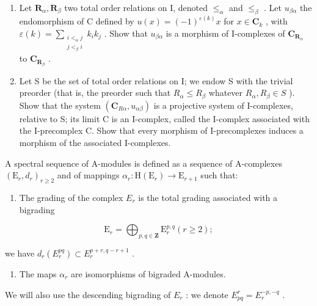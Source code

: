 \begin{enumerate}
\def\labelenumi{\alph{enumi})}
\setcounter{enumi}{2}
\item
  Let \(\mathbf{R}_{\alpha}, \mathbf{R}_{\beta}\) two total order relations on I, denoted \(\leqslant_{\alpha}\) and \(\leqslant_{\beta}\) . Let \(u_{\beta \alpha}\) the endomorphism of C defined by \(u(x) = (-1)^{\varepsilon(k)} x\) for \(x \in \mathbf{C}_k\) , with \(\varepsilon(k) = \sum_{\substack{i < _{\alpha} j \\ j < _{\beta} i}} k_i k_j\) . Show that \(u_{\beta \alpha}\) is a morphism of I-complexes of \(\mathbf{C}_{\mathbf{R}_{\alpha}}\) to \(\mathbf{C}_{\mathbf{R}_{\beta}}\) .
\item
  Let S be the set of total order relations on I; we endow S with the trivial preorder (that is, the preorder such that \(R_{\alpha} \leqslant R_{\beta}\) whatever \(R_{\alpha}, R_{\beta} \in S\) ). Show that the system \((\mathbf{C}_{R\alpha}, u_{\alpha\beta})\) is a projective system of I-complexes, relative to S; its limit C is an I-complex, called the I-complex associated with the I-precomplex C. Show that every morphism of I-precomplexes induces a morphism of the associated I-complexes.
\end{enumerate}

A spectral sequence of A-modules is defined as a sequence of A-complexes \((\mathrm{E}_r, d_r)_{r \geqslant 2}\) and of mappings \(\alpha_r: \mathrm{H}(\mathrm{E}_r) \to \mathrm{E}_{r+1}\) such that:

\begin{enumerate}
\def\labelenumi{(\roman{enumi})}
\tightlist
\item
  The grading of the complex \(E_r\) is the total grading associated with a bigrading
\end{enumerate}

\[
\mathrm{E} _ {r} = \bigoplus_ {p, q \in \mathbf {Z}} \mathrm{E} _ {r} ^ {p, q} (r \geqslant 2);
\]

we have \(d_r(E_r^{pq}) \subset E_r^{p + r,q - r + 1}\) .

\begin{enumerate}
\def\labelenumi{(\roman{enumi})}
\setcounter{enumi}{1}
\tightlist
\item
  The maps \(\alpha_{r}\) are isomorphisms of bigraded A-modules.
\end{enumerate}

We will also use the descending bigrading of \(E_{r}\) : we denote \(E_{pq}^{r} = E_{r}^{-p, -q}\) .

